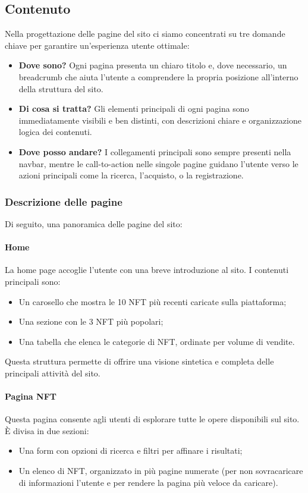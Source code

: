 \documentclass[10pt]{article}
\begin{document}
\subsection{Contenuto} Nella progettazione delle pagine del sito ci siamo concentrati su tre domande chiave per garantire un’esperienza utente ottimale: \begin{itemize} \item \textbf{Dove sono?} Ogni pagina presenta un chiaro titolo e, dove necessario, un breadcrumb che aiuta l’utente a comprendere la propria posizione all’interno della struttura del sito. \item \textbf{Di cosa si tratta?} Gli elementi principali di ogni pagina sono immediatamente visibili e ben distinti, con descrizioni chiare e organizzazione logica dei contenuti. \item \textbf{Dove posso andare?} I collegamenti principali sono sempre presenti nella navbar, mentre le call-to-action nelle singole pagine guidano l’utente verso le azioni principali come la ricerca, l’acquisto, o la registrazione. \end{itemize}

\subsubsection{Descrizione delle pagine} Di seguito, una panoramica delle pagine del sito:

\paragraph{Home} La home page accoglie l’utente con una breve introduzione al sito. I contenuti principali sono: \begin{itemize} \item Un carosello che mostra le 10 NFT più recenti caricate sulla piattaforma; \item Una sezione con le 3 NFT più popolari; \item Una tabella che elenca le categorie di NFT, ordinate per volume di vendite. \end{itemize} Questa struttura permette di offrire una visione sintetica e completa delle principali attività del sito.

\paragraph{Pagina NFT} Questa pagina consente agli utenti di esplorare tutte le opere disponibili sul sito. È divisa in due sezioni: \begin{itemize} \item Una form con opzioni di ricerca e filtri per affinare i risultati; \item Un elenco di NFT, organizzato in più pagine numerate (per non sovracaricare di informazioni l'utente e per rendere la pagina più veloce da caricare). \end{itemize}
\end{document}
